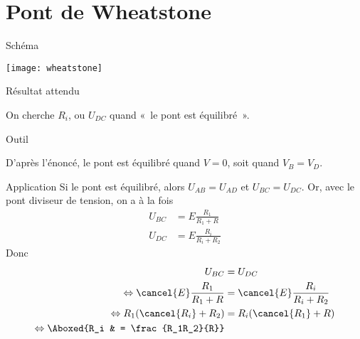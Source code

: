 \documentclass[a4paper, 12pt, final, garamond]{book}
\begin{document}
\section{Pont de Wheatstone}

\begin{tcbraster}[raster columns=6, raster equal height=rows]
    \begin{NCdefi}[raster multicolumn=2]{Schéma}
        \begin{center}
            \texttt{[image: wheatstone]}
        \end{center}
    \end{NCdefi}
    \begin{tcolorbox}[blankest, raster multicolumn=1, space to=\myspace]
        \begin{tcbraster}[raster columns=1]
            \begin{NCprop}[add to natural height=\myspace]{Résultat attendu}

                \fontsize{10pt}{12pt}\selectfont On cherche $R_i$, ou $U_{DC}$
                quand «~le pont est équilibré~».

            \end{NCprop}
            \begin{NCrapp}{Outil}

                \fontsize{10pt}{12pt}\selectfont D'après l'énoncé, le pont est
                équilibré quand $V = 0$, soit quand $V_B = V_D$.

            \end{NCrapp}
        \end{tcbraster}
    \end{tcolorbox}
    \begin{NCexem}[raster multicolumn=3]{Application}
        Si le pont est équilibré, alors $U_{AB} = U_{AD}$ et $U_{BC} = U_{DC}$.
        Or, avec le pont diviseur de tension, on a à la fois
        \begin{align*}
            U_{BC} & = E \frac{R_1}{R_1+R}\\
            U_{DC} & = E \frac{R_i}{R_i+R_2}
        \end{align*}
        Donc
        \begin{align*}
            U_{BC} &= U_{DC}\\
            \Leftrightarrow \cancel{E} \frac{R_1}{R_1+R}
                   & = \cancel{E} \frac{R_i}{R_i+R_2}\\
            \Leftrightarrow R_1(\cancel{R_i}+R_2) & = R_i(\cancel{R_1}+R)\\
            \Leftrightarrow \Aboxed{R_i & = \frac{R_1R_2}{R}}
        \end{align*}
    \end{NCexem}
\end{tcbraster}
\end{document}

